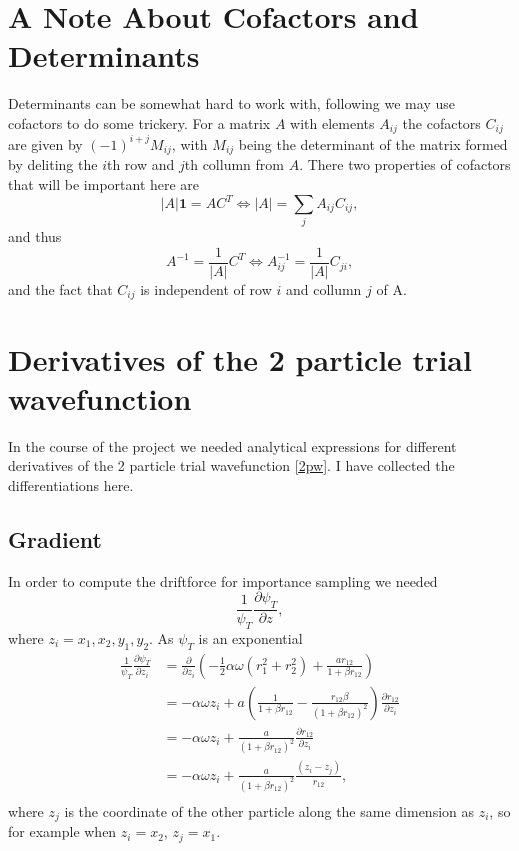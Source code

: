\documentclass[a4paper,English,10pt]{article}
\newcommand{\bb}[1]{\boldsymbol{#1}}
\newcommand{\p}{\partial}
\newcommand{\pddt}[2]{\frac{\p #1}{\p #2}}
\newcommand{\id}{\bb{1}}
\newcommand{\be}{\begin{equation}}
\newcommand{\ee}{\end{equation}}
\newcommand{\f}{\frac}
\begin{document}
\appendix
\section{A Note About Cofactors and Determinants}\label{cofac}
Determinants can be somewhat hard to work with, following \cite{mortenbok} we may use cofactors to do some trickery.
For a matrix $A$ with elements $A_{ij}$ the cofactors $C_{ij}$ are given by $(-1)^{i+j} M_{ij}$, with $M_{ij}$ being the determinant of the matrix formed by deliting the $i$th
row and $j$th collumn from $A$. There two properties of cofactors that will be important here are
\be
|A|\id = A C^T \Leftrightarrow |A| = \sum_jA_{ij}C_{ij},
\ee
and thus
\be
A^{-1} = \f{1}{|A|}C^T \Leftrightarrow A^{-1}_{ij} = \f{1}{|A|}C_{ji},
\ee
and the fact that $C_{ij}$ is independent of row $i$ and collumn $j$ of A.





\section{Derivatives of the 2 particle trial wavefunction}
In the course of the project we needed analytical expressions for different derivatives of the 2 particle trial wavefunction \ref{2pw}. I have collected
the differentiations here.

\subsection{Gradient}\label{app2pg}
In order to compute the driftforce for importance sampling we needed
\[\f{1}{\psi_T}\pddt{\psi_T}{z},\]
where \(z_i = x_1,x_2,y_1,y_2\).
As \(\psi_T\) is an exponential
\begin{align*}
  \f{1}{\psi_T}\pddt{\psi_T}{z_i} &= \pddt{}{z_i}\left(-\f{1}{2}\alpha\omega(r_1^2+r_2^2) + \f{ar_{12}}{1+\beta r_{12}}\right)\\
  &= -\alpha\omega z_i + a\left(\f{1}{1+\beta r_{12}} - \f{r_{12}\beta}{(1+\beta r_{12})^2}\right)\pddt{r_{12}}{z_i}\\
  &= -\alpha\omega z_i + \f{a}{(1+\beta r_{12})^2}\pddt{r_{12}}{z_i}\\
  &= -\alpha\omega z_i + \f{a}{(1+\beta r_{12})^2}\f{(z_i-z_j)}{r_{12}},\\
\end{align*}
where \(z_j\) is the coordinate of the other particle along the same dimension as \(z_i\), so for example when
\(z_i=x_2\), \(z_j = x_1\).
\end{document}
